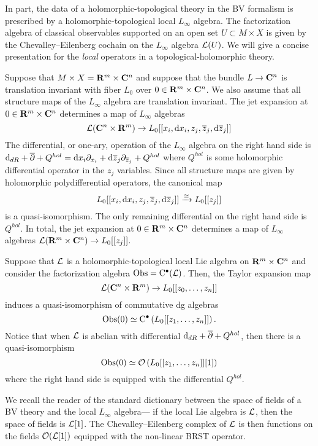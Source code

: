 \documentclass[11pt]{amsart}
\begin{document}
In part, the data of a holomorphic-topological theory in the BV formalism is prescribed by a holomorphic-topological local $L_\infty$ algebra. 
The factorization algebra of classical observables supported on an open set $U \subset M \times X$ is given by the Chevalley--Eilenberg cochain on the $L_\infty$ algebra $\mathcal L(U)$. 
We will give a concise presentation for the {\em local} operators in a topological-holomorphic theory. 

Suppose that $M \times X = \mathbf{R}^m \times \mathbf{C}^n$ and suppose that the bundle $L \to \mathbf{C}^n$ is translation invariant with fiber $L_0$ over $0 \in \mathbf{R}^m \times \mathbf{C}^n$.
We also assume that all structure maps of the $L_\infty$ algebra are translation invariant.
The jet expansion at $0 \in \mathbf{R}^m \times \mathbf{C}^n$ determines a map of $L_\infty$ algebras
\[
\mathcal L(\mathbf{C}^n \times \mathbf{R}^m) \to L_0 [[x_i, {\rm d} x_i,z_j, \overline{z}_j, {\rm d} \overline{z}_j]] 
\]
The differential, or one-ary, operation of the $L_\infty$ algebra on the right hand side is ${\rm d}_{dR} + \overline{\partial} + Q^{hol} = {\rm d} x_i \partial_{x_i} + {\rm d} \overline{z}_j \partial_{\overline{z}_j} + Q^{hol}$ where $Q^{hol}$ is some holomorphic differential operator in the $z_j$ variables. 
Since all structure maps are given by holomorphic polydifferential operators, the canonical map 
\[
L_0 [[x_i, {\rm d} x_i,z_j, \overline{z}_j, {\rm d} \overline{z}_j]] \xrightarrow{\simeq} L_0 [[z_j]] 
\]
is a quasi-isomorphism. 
The only remaining differential on the right hand side is~$Q^{hol}$. 
In total, the jet expansion at $0 \in \mathbf{R}^m \times \mathbf{C}^n$ determines a map of $L_\infty$ algebras $\mathcal L(\mathbf{R}^m \times \mathbf{C}^n) \to L_0[[z_j]]$. 
 
\begin{lem}
\label{lem:localops}
Suppose that $\mathcal L$ is a holomorphic-topological local Lie algebra on $\mathbf{R}^m \times \mathbf{C}^n$ and consider the factorization algebra $\operatorname{Obs} = {\rm C}^\bullet (\mathcal L)$. 
Then, the Taylor expansion map
\[
\mathcal L(\mathbf{C}^n \times \mathbf{R}^m) \to L_0[[z_0,\ldots,z_n]]
\]
induces a quasi-isomorphism of commutative dg algebras
\[
\operatorname{Obs}(0) \simeq {\rm C}^\bullet \left( L_0[[z_1,\ldots,z_n]] \right) .
\]
Notice that when $\mathcal L$ is abelian with differential ${\rm d}_{dR} + \overline{\partial} + Q^{hol}$, then there is a quasi-isomorphism
\[
\operatorname{Obs}(0) \simeq \mathcal O \left( L_0[[z_1,\ldots,z_n]][1] \right) 
\]
where the right hand side is equipped with the differential $Q^{hol}$. 
\end{lem}

We recall the reader of the standard dictionary between the space of fields of a BV theory and the local $L_\infty$ algebra---
if the local Lie algebra is $\mathcal L$, then the space of fields is $\mathcal L[1]$. 
The Chevalley--Eilenberg complex of $\mathcal L$ is then functions on the fields $\mathcal O(\mathcal L[1])$ equipped with the non-linear BRST operator.
\end{document}
